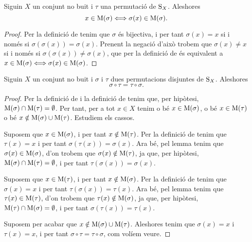 \documentclass[../Apunts.tex]{subfiles}
\begin{document}
	\begin{lemma}
		\label{lemma:permutacions disjuntes commuten}
		Siguin \(X\) un conjunt no buit i \(\tau\) una permutació de \(\operatorname{S}_{X}\). Aleshores
		\[x\in\operatorname{M}(\sigma)\Longleftrightarrow\sigma(x)\in\operatorname{M}(\sigma).\]
		\begin{proof}
			Per la definició de  tenim que \(\sigma\) és bijectiva, i per tant \(\sigma(x)=x\) si i només si \(\sigma(\sigma(x))=\sigma(x)\). Prenent la negació d'això trobem que \(\sigma(x)\neq x\) si i només si \(\sigma(\sigma(x))\neq\sigma(x)\), que per la definició de  és equivalent a \(x\in\operatorname{M}(\sigma)\Longleftrightarrow\sigma(x)\in\operatorname{M}(\sigma)\).
		\end{proof}
	\end{lemma}
	\begin{theorem}
		\label{thm:permutacions disjuntes commuten}
		Siguin \(X\) un conjunt no buit i \(\sigma\) i \(\tau\) dues permutacions disjuntes de \(\operatorname{S}_{X}\). Aleshores
		\[\sigma\circ\tau=\tau\circ\sigma.\]
		\begin{proof}
			Per la definició de  i la definició de  tenim que, per hipòtesi, \(\operatorname{M}(\sigma)\cap\operatorname{M}(\tau)=\emptyset\). Per tant, per a tot \(x\in X\) tenim o bé \(x\in\operatorname{M}(\sigma)\), o bé \(x\in\operatorname{M}(\tau)\) o bé \(x\notin\operatorname{M}(\sigma)\cup\operatorname{M}(\tau)\). Estudiem els cassos.
			
			Suposem que \(x\in\operatorname{M}(\sigma)\), i per tant \(x\notin\operatorname{M}(\tau)\). Per la definició de  tenim que \(\tau(x)=x\) i per tant \(\sigma(\tau(x))=\sigma(x)\). Ara bé, pel lemma  tenim que \(\sigma(x)\in\operatorname{M}(\sigma)\), d'on trobem que \(\sigma(x)\notin\operatorname{M}(\tau)\), ja que, per hipòtesi, \(\operatorname{M}(\sigma)\cap\operatorname{M}(\tau)=\emptyset\), i per tant \(\tau(\sigma(x))=\sigma(x)\).
			
			Suposem que \(x\in\operatorname{M}(\tau)\), i per tant \(x\notin\operatorname{M}(\sigma)\). Per la definició de  tenim que \(\sigma(x)=x\) i per tant \(\tau(\sigma(x))=\tau(x)\). Ara bé, pel lemma  tenim que \(\tau(x)\in\operatorname{M}(\tau)\), d'on trobem que \(\tau(x)\notin\operatorname{M}(\sigma)\), ja que, per hipòtesi, \(\operatorname{M}(\tau)\cap\operatorname{M}(\sigma)=\emptyset\), i per tant \(\sigma(\tau(x))=\tau(x)\). %
			
			Suposem per acabar que \(x\notin\operatorname{M}(\sigma)\cup\operatorname{M}(\tau)\). Aleshores tenim que \(\sigma(x)=x\) i \(\tau(x)=x\), i per tant \(\sigma\circ\tau=\tau\circ\sigma\), com volíem veure.
		\end{proof} %
	\end{theorem}
\end{document}
